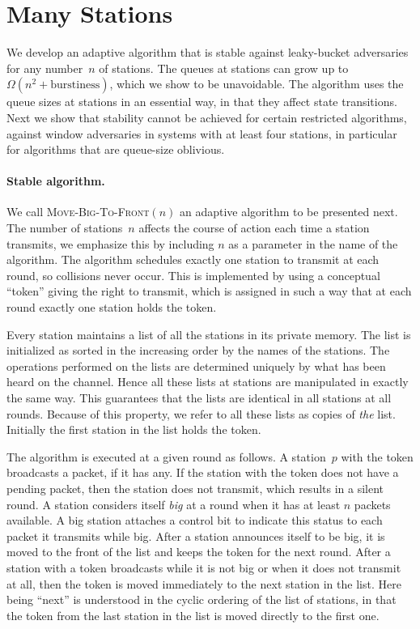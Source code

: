 \documentclass[11pt]{article}
\newcommand{\BBB}{\vspace*{-\bigskipamount}}
\newcommand{\Paragraph}[1]{\BBB\paragraph{#1}}
\begin{document}
\section{Many Stations}

\label{sec:four}




We develop an adaptive algorithm that is stable against leaky-bucket adversaries for any number~$n$ of stations.
The queues at stations can grow up to $\Omega(n^2+\text{burstiness})$, which we show to be unavoidable.
The algorithm uses the queue sizes at stations in an essential way, in that they affect state transitions.
Next we show that stability cannot be achieved for certain restricted algorithms, against window adversaries in systems with at least four stations, in particular for algorithms that are queue-size oblivious. 





\Paragraph{Stable algorithm.}




We call \textsc{Move-Big-To-Front}$(n)$ an adaptive algorithm to be presented next.
The number of stations~$n$ affects the course of action each time a station transmits, we emphasize this by including $n$ as a parameter in the name of the algorithm.
The algorithm schedules exactly one station to transmit at each round, so collisions never occur.
This is implemented by using a conceptual ``token'' giving the right to transmit, which is assigned in such a way that at each round exactly one station holds the token.


Every station maintains a list of all the stations in its private memory.
The list is initialized as sorted in the increasing order by the names of the stations.
The operations performed on the lists are determined uniquely by what has been heard on the channel.
Hence all these lists at stations are manipulated in exactly the same way.
This guarantees that the lists are identical in all stations at all rounds.
Because of this property, we refer to all these lists as copies of \emph{the} list.
Initially the first station in the list holds the token.


The algorithm is executed at a given round as follows.
A station~$p$ with the token broadcasts a packet, if it has any.
If the station with the token does not have a pending packet, then the station does not transmit, which results in a silent round.
A station considers itself \emph{big} at a round when it has at least $n$ packets available.
A big station attaches a control bit to indicate this status to each packet it transmits while big.
After a station announces itself to be big,  it is moved to the front of the list and keeps the token for the next round.
After a station with a token broadcasts while it is not big or when it does not transmit at all, then the token is moved immediately to the next station in the list.
Here being ``next'' is understood in the cyclic ordering of the list of stations, in that the token from the last station in the list is moved directly to the first one.
\end{document}
